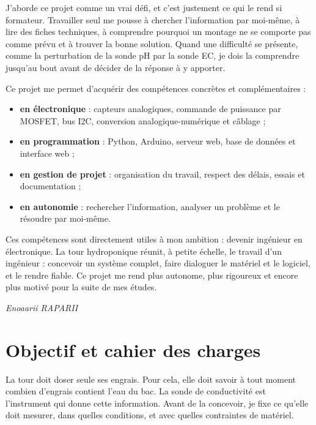 \documentclass[11pt,a4paper]{article}
\begin{document}
J'aborde ce projet comme un vrai défi, et c'est justement ce qui le rend si formateur. Travailler seul me pousse à chercher l'information par moi-même, à lire des fiches techniques, à comprendre pourquoi un montage ne se comporte pas comme prévu et à trouver la bonne solution. Quand une difficulté se présente, comme la perturbation de la sonde pH par la sonde EC, je dois la comprendre jusqu'au bout avant de décider de la réponse à y apporter.

Ce projet me permet d'acquérir des compétences concrètes et complémentaires :
\begin{itemize}
\item \textbf{en électronique} : capteurs analogiques, commande de puissance par MOSFET, bus I2C, conversion analogique-numérique et câblage ;
\item \textbf{en programmation} : Python, Arduino, serveur web, base de données et interface web ;
\item \textbf{en gestion de projet} : organisation du travail, respect des délais, essais et documentation ;
\item \textbf{en autonomie} : rechercher l'information, analyser un problème et le résoudre par moi-même.
\end{itemize}

Ces compétences sont directement utiles à mon ambition : devenir ingénieur en électronique. La tour hydroponique réunit, à petite échelle, le travail d'un ingénieur : concevoir un système complet, faire dialoguer le matériel et le logiciel, et le rendre fiable. Ce projet me rend plus autonome, plus rigoureux et encore plus motivé pour la suite de mes études.

\begin{flushright}
\textit{Enoaarii RAPARII}
\end{flushright}
\newpage

\setcounter{page}{1}
\tableofcontents
\newpage

\section{Objectif et cahier des charges}

La tour doit doser seule ses engrais. Pour cela, elle doit savoir à tout moment combien d'engrais contient l'eau du bac. La sonde de conductivité est l'instrument qui donne cette information. Avant de la concevoir, je fixe ce qu'elle doit mesurer, dans quelles conditions, et avec quelles contraintes de matériel.
\end{document}
